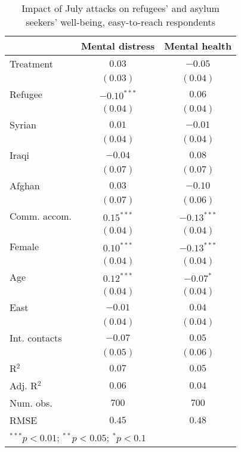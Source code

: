 
\begin{table}
\caption{Impact of July attacks on refugees' and asylum seekers' well-being, easy-to-reach respondents}
\begin{center}
\begin{tabular}{l c c}
\toprule
 & Mental distress & Mental health \\
\midrule
Treatment     & $0.03$        & $-0.05$       \\
              & $(0.03)$      & $(0.04)$      \\
Refugee       & $-0.10^{***}$ & $0.06$        \\
              & $(0.04)$      & $(0.04)$      \\
Syrian        & $0.01$        & $-0.01$       \\
              & $(0.04)$      & $(0.04)$      \\
Iraqi         & $-0.04$       & $0.08$        \\
              & $(0.07)$      & $(0.07)$      \\
Afghan        & $0.03$        & $-0.10$       \\
              & $(0.07)$      & $(0.06)$      \\
Comm. accom.  & $0.15^{***}$  & $-0.13^{***}$ \\
              & $(0.04)$      & $(0.04)$      \\
Female        & $0.10^{***}$  & $-0.13^{***}$ \\
              & $(0.04)$      & $(0.04)$      \\
Age           & $0.12^{***}$  & $-0.07^{*}$   \\
              & $(0.04)$      & $(0.04)$      \\
East          & $-0.01$       & $0.04$        \\
              & $(0.04)$      & $(0.04)$      \\
Int. contacts & $-0.07$       & $0.05$        \\
              & $(0.05)$      & $(0.06)$      \\
\midrule
R$^2$         & $0.07$        & $0.05$        \\
Adj. R$^2$    & $0.06$        & $0.04$        \\
Num. obs.     & $700$         & $700$         \\
RMSE          & $0.45$        & $0.48$        \\
\bottomrule
\multicolumn{3}{l}{\scriptsize{$^{***}p<0.01$; $^{**}p<0.05$; $^{*}p<0.1$}}
\end{tabular}
\label{tab_mhealth_reach}
\end{center}
\end{table}
